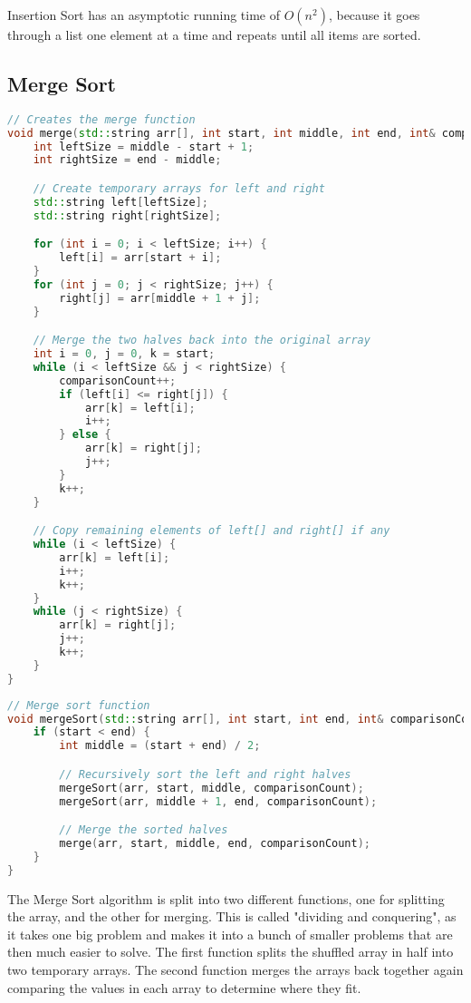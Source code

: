 \documentclass[letterpaper, 10pt,DIV=13]{scrartcl}
\numberwithin{equation}{section} %
\numberwithin{figure}{section} %
\numberwithin{table}{section} %
\begin{document}
Insertion Sort has an asymptotic running time of  $O(n^2)$, because it goes through a list one element at a time and repeats until all items are sorted.
\pagebreak
\subsection{Merge Sort}
\begin{lstlisting}[language=c++, caption= Merge Function]
    // Creates the merge function
void merge(std::string arr[], int start, int middle, int end, int& comparisonCount) {
    int leftSize = middle - start + 1;
    int rightSize = end - middle;

    // Create temporary arrays for left and right
    std::string left[leftSize];
    std::string right[rightSize];

    for (int i = 0; i < leftSize; i++) {
        left[i] = arr[start + i];
    }
    for (int j = 0; j < rightSize; j++) {
        right[j] = arr[middle + 1 + j];
    }

    // Merge the two halves back into the original array
    int i = 0, j = 0, k = start;
    while (i < leftSize && j < rightSize) {
        comparisonCount++;
        if (left[i] <= right[j]) {
            arr[k] = left[i];
            i++;
        } else {
            arr[k] = right[j];
            j++;
        }
        k++;
    }

    // Copy remaining elements of left[] and right[] if any
    while (i < leftSize) {
        arr[k] = left[i];
        i++;
        k++;
    }
    while (j < rightSize) {
        arr[k] = right[j];
        j++;
        k++;
    }
}
\end{lstlisting}
\pagebreak
\begin{lstlisting}[language=c++, caption= Merge Sort Algorithm]
    // Merge sort function
void mergeSort(std::string arr[], int start, int end, int& comparisonCount) {
    if (start < end) {
        int middle = (start + end) / 2;

        // Recursively sort the left and right halves
        mergeSort(arr, start, middle, comparisonCount);
        mergeSort(arr, middle + 1, end, comparisonCount);

        // Merge the sorted halves
        merge(arr, start, middle, end, comparisonCount);
    }
}
\end{lstlisting}
The Merge Sort algorithm is split into two different functions, one for splitting the array, and the other for merging. This is called "dividing and conquering", as it takes one big problem and makes it into a bunch of smaller problems that are then much easier to solve. The first function splits the shuffled array in half into two temporary arrays. The second function merges the arrays back together again comparing the values in each array to determine where they fit.
\end{document}

